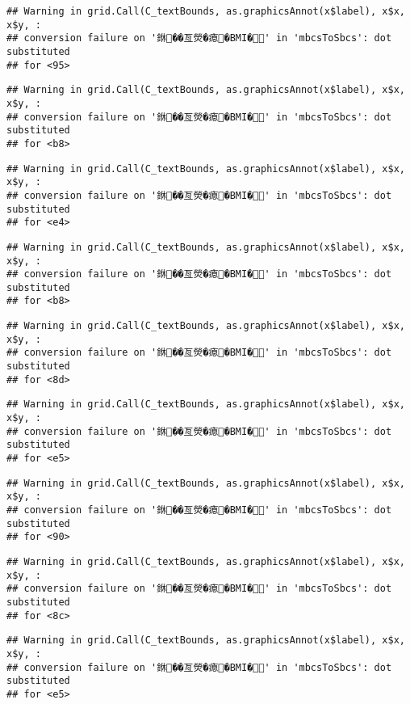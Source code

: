 \documentclass[
]{article}
\begin{document}
\begin{verbatim}
## Warning in grid.Call(C_textBounds, as.graphicsAnnot(x$label), x$x, x$y, :
## conversion failure on '銝��亙熒�瘜�BMI�' in 'mbcsToSbcs': dot substituted
## for <95>
\end{verbatim}

\begin{verbatim}
## Warning in grid.Call(C_textBounds, as.graphicsAnnot(x$label), x$x, x$y, :
## conversion failure on '銝��亙熒�瘜�BMI�' in 'mbcsToSbcs': dot substituted
## for <b8>
\end{verbatim}

\begin{verbatim}
## Warning in grid.Call(C_textBounds, as.graphicsAnnot(x$label), x$x, x$y, :
## conversion failure on '銝��亙熒�瘜�BMI�' in 'mbcsToSbcs': dot substituted
## for <e4>
\end{verbatim}

\begin{verbatim}
## Warning in grid.Call(C_textBounds, as.graphicsAnnot(x$label), x$x, x$y, :
## conversion failure on '銝��亙熒�瘜�BMI�' in 'mbcsToSbcs': dot substituted
## for <b8>
\end{verbatim}

\begin{verbatim}
## Warning in grid.Call(C_textBounds, as.graphicsAnnot(x$label), x$x, x$y, :
## conversion failure on '銝��亙熒�瘜�BMI�' in 'mbcsToSbcs': dot substituted
## for <8d>
\end{verbatim}

\begin{verbatim}
## Warning in grid.Call(C_textBounds, as.graphicsAnnot(x$label), x$x, x$y, :
## conversion failure on '銝��亙熒�瘜�BMI�' in 'mbcsToSbcs': dot substituted
## for <e5>
\end{verbatim}

\begin{verbatim}
## Warning in grid.Call(C_textBounds, as.graphicsAnnot(x$label), x$x, x$y, :
## conversion failure on '銝��亙熒�瘜�BMI�' in 'mbcsToSbcs': dot substituted
## for <90>
\end{verbatim}

\begin{verbatim}
## Warning in grid.Call(C_textBounds, as.graphicsAnnot(x$label), x$x, x$y, :
## conversion failure on '銝��亙熒�瘜�BMI�' in 'mbcsToSbcs': dot substituted
## for <8c>
\end{verbatim}

\begin{verbatim}
## Warning in grid.Call(C_textBounds, as.graphicsAnnot(x$label), x$x, x$y, :
## conversion failure on '銝��亙熒�瘜�BMI�' in 'mbcsToSbcs': dot substituted
## for <e5>
\end{verbatim}
\end{document}
